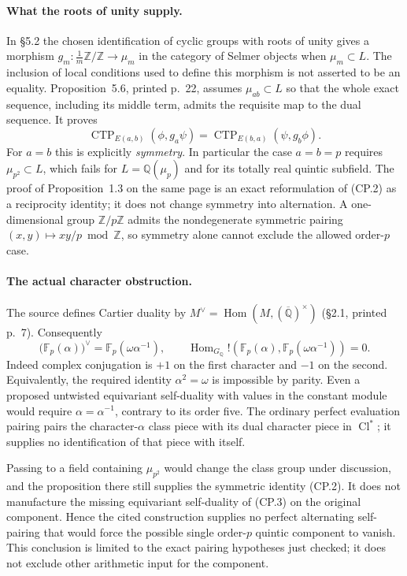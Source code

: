\paragraph{What the roots of unity supply.}
In \S5.2 the chosen identification of cyclic groups with roots of unity
gives a morphism $g_m:\frac1m\mathbb Z/\mathbb Z\to\mu_m$ in the
category of Selmer objects when $\mu_m\subset L$.  The inclusion of local
conditions used to define this morphism is not asserted to be an equality.
Proposition~5.6, printed p.~22, assumes $\mu_{ab}\subset L$ so that the
whole exact sequence, including its middle term, admits the requisite
map to the dual sequence.  It proves
\[
 \operatorname{CTP}_{E(a,b)}(\phi,g_a\psi)
 =\operatorname{CTP}_{E(b,a)}(\psi,g_b\phi).
 \tag{CP.2}
\]
For $a=b$ this is explicitly \emph{symmetry}.  In particular the case
$a=b=p$ requires $\mu_{p^2}\subset L$, which fails for
$L=\mathbb Q(\mu_p)$ and for its totally real quintic subfield.
The proof of Proposition~1.3 on the same page is an exact reformulation
of (CP.2) as a reciprocity identity; it does not change symmetry into
alternation.  A one-dimensional group $\mathbb Z/p\mathbb Z$ admits the
nondegenerate symmetric pairing $(x,y)\mapsto xy/p\bmod\mathbb Z$, so
symmetry alone cannot exclude the allowed order-$p$ case.

\paragraph{The actual character obstruction.}
The source defines Cartier duality by
$M^\vee=\operatorname{Hom}(M,(\overline{\mathbb Q})^\times)$
(\S2.1, printed p.~7).  Consequently
\[
 \bigl(\mathbb F_p(\alpha)\bigr)^\vee
   =\mathbb F_p(\omega\alpha^{-1}),\qquad
 \operatorname{Hom}_{G_{\mathbb Q}}!
 \left(\mathbb F_p(\alpha),
       \mathbb F_p(\omega\alpha^{-1})\right)=0.
 \tag{CP.3}
\]
Indeed complex conjugation is $+1$ on the first character and $-1$ on
the second.  Equivalently, the required identity $\alpha^2=\omega$
is impossible by parity.  Even a proposed untwisted equivariant
self-duality with values in the constant module would require
$\alpha=\alpha^{-1}$, contrary to its order five.  The ordinary
perfect evaluation pairing pairs the character-$\alpha$ class piece
with its dual character piece in $\operatorname{Cl}^{*}$; it supplies
no identification of that piece with itself.

Passing to a field containing $\mu_{p^2}$ would change the class group
under discussion, and the proposition there still supplies the symmetric
identity (CP.2).  It does not manufacture the missing equivariant
self-duality of (CP.3) on the original component.  Hence the cited
construction supplies no perfect alternating self-pairing that would
force the possible single order-$p$ quintic component to vanish.
This conclusion is limited to the exact pairing hypotheses just checked;
it does not exclude other arithmetic input for the component.


